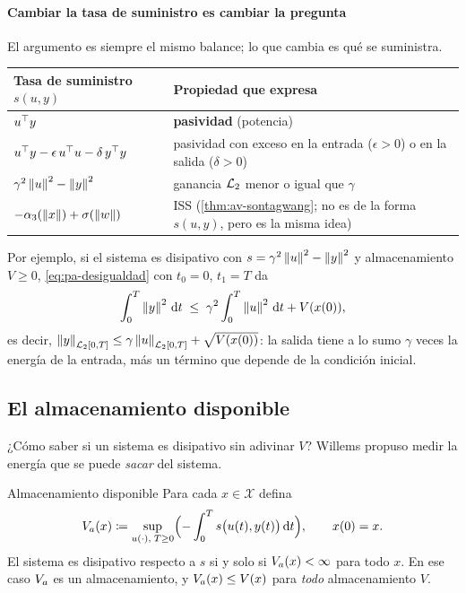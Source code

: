 \paragraph{Cambiar la tasa de suministro es cambiar la pregunta}
El argumento es siempre el mismo balance; lo que cambia es qué se suministra.

\begin{center}\small
\begin{tabular}{@{}p{5.2cm}p{7.2cm}@{}}
\toprule
\textbf{Tasa de suministro} $s(u,y)$ & \textbf{Propiedad que expresa}\\
\midrule
$u^{\top} y$ & \textbf{pasividad} (potencia)\\[2pt]
$u^{\top} y-\epsilon\,u^{\top} u-\delta\,y^{\top} y$ & pasividad con exceso en la entrada ($\epsilon>0$) o en la salida ($\delta>0$)\\[2pt]
$\gamma^2\left\lVert u\right\rVert^2-\left\lVert y\right\rVert^2$ & ganancia $\mathcal{L}_{2}$ menor o igual que $\gamma$\\[2pt]
$-\alpha_3(\left\lVert x\right\rVert)+\sigma(\left\lVert w\right\rVert)$ & ISS (\cref{thm:av-sontagwang}; no es de la forma $s(u,y)$, pero es la misma idea)\\
\bottomrule
\end{tabular}
\end{center}

Por ejemplo, si el sistema es disipativo con $s=\gamma^2\left\lVert u\right\rVert^2-\left\lVert y\right\rVert^2$ y almacenamiento $V\ge0$, \eqref{eq:pa-desigualdad} con $t_0=0$, $t_1=T$ da
\[
  \int_0^T\left\lVert y\right\rVert^2\,\mathrm{d} t\;\le\;\gamma^2\int_0^T\left\lVert u\right\rVert^2\,\mathrm{d} t+V(x(0)) ,
\]
es decir, $\left\lVert y\right\rVert_{\mathcal{L}_{2}[0,T]}\le\gamma\left\lVert u\right\rVert_{\mathcal{L}_{2}[0,T]}+\sqrt{V(x(0))}$: la salida tiene a lo sumo $\gamma$ veces la energía de la entrada, más un término que depende de la condición inicial.

\subsection{El almacenamiento disponible}
\label{sec:pa-disponible}

¿Cómo saber si un sistema es disipativo sin adivinar $V$? Willems propuso medir la energía que se puede \emph{sacar} del sistema.

\begin{teorema}[label=thm:pa-disponible]{Almacenamiento disponible \citep{Wil72a}}
Para cada $x\in\mathcal X$ defina
\begin{equation}
  V_a(x)\coloneqq\sup_{u(\cdot),\;T\ge0}\Bigl(-\int_0^T s\bigl(u(t),y(t)\bigr)\,\mathrm{d} t\Bigr),\qquad x(0)=x .
  \label{eq:pa-Va}
\end{equation}
El sistema es disipativo respecto a $s$ si y solo si $V_a(x)<\infty$ para todo $x$. En ese caso $V_a$ es un almacenamiento, y $V_a(x)\le V(x)$ para \emph{todo} almacenamiento $V$.
\end{teorema}

